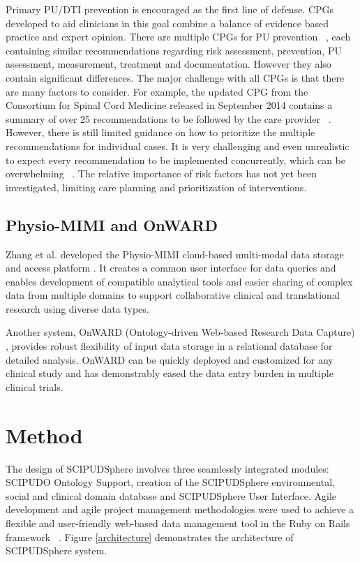 \documentclass{amia}
\begin{document}
Primary PU/DTI prevention is encouraged as the first line of defense. CPGs developed to aid clinicians in this goal combine a balance of evidence based practice and expert opinion. There are multiple CPGs for PU prevention ~\cite{cpg1, cpg2, cpg3, cpg4}, each containing similar recommendations regarding risk assessment, prevention, PU assessment, measurement, treatment and documentation. However they also contain significant differences. The major challenge with all CPGs is that there are many factors to consider. For example, the updated CPG from the Consortium for Spinal Cord Medicine released in September 2014 contains a summary of over 25 recommendations to be followed by the care provider ~\cite{cpg5}. However, there is still limited guidance on how to prioritize the multiple recommendations for individual cases. It is very challenging and even unrealistic to expect every recommendation to be implemented concurrently, which can be overwhelming ~\cite{ref3}. The relative importance of risk factors has not yet been investigated, limiting care planning and prioritization of interventions.

\subsection{Physio-MIMI and OnWARD}
Zhang et al. developed the Physio-MIMI cloud-based multi-modal data storage and access platform \cite{physiomimi}. It creates a common user interface for data queries and enables development of compatible analytical tools and easier sharing of complex data from multiple domains to support collaborative clinical and translational research using diverse data types. 

Another system, OnWARD (Ontology-driven Web-based Research Data Capture) \cite{onward}, provides robust flexibility of input data storage in a relational database for detailed analysis. OnWARD can be quickly deployed and customized for any clinical study and has demonstrably eased the data entry burden in multiple clinical trials. 

\section{Method}
The design of SCIPUDSphere involves three seamlessly integrated modules: SCIPUDO Ontology Support, creation of the SCIPUDSphere environmental, social and clinical domain database and SCIPUDSphere User Interface. Agile development and agile project management methodologies were used to achieve a flexible and user-friendly web-based data management tool in the Ruby on Rails framework ~\cite{ror}. Figure \ref{architecture} demonstrates the architecture of SCIPUDSphere system. 
\end{document}
